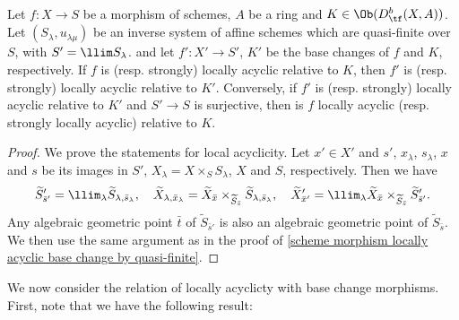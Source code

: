 \begin{corollary}\label{scheme morphism locally acyclic base change by limit}
Let $f:X\to S$ be a morphism of schemes, $A$ be a ring and $K\in\Ob(D^b_{\tf}(X,A))$. Let $(S_\lambda,u_{\lambda\mu})$ be an inverse system of affine schemes which are quasi-finite over $S$, with $S'=\llim S_\lambda$. and let $f':X'\to S'$, $K'$ be the base changes of $f$ and $K$, respectively. If $f$ is (resp. strongly) locally acyclic relative to $K$, then $f'$ is (resp. strongly) locally acyclic relative to $K'$. Conversely, if $f'$ is (resp. strongly) locally acyclic relative to $K'$ and $S'\to S$ is surjective, then is $f$ locally acyclic (resp. strongly locally acyclic) relative to $K$.
\end{corollary}
\begin{proof}
We prove the statements for local acyclicity. Let $x'\in X'$ and $s'$, $x_\lambda$, $s_\lambda$, $x$ and $s$ be its images in $S'$, $X_\lambda=X\times_SS_\lambda$, $X$ and $S$, respectively. Then we have
\[\widetilde{S}'_{\bar{s}'}=\llim_\lambda\widetilde{S}_{\lambda,\bar{s}_\lambda},\quad \widetilde{X}_{\lambda,\bar{x}_\lambda}=\widetilde{X}_{\bar{x}}\times_{\widetilde{S}_{\bar{s}}}\widetilde{S}_{\lambda,\bar{s}_\lambda},\quad \widetilde{X}'_{\bar{x}'}=\llim_\lambda\widetilde{X}_{\bar{x}}\times_{\widetilde{S}_{\bar{s}}}\widetilde{S}'_{\bar{s}'}.\]
Any algebraic geometric point $\bar{t}$ of $\widetilde{S}_{\bar{s}'}$ is also an algebraic geometric point of $\widetilde{S}_{\bar{s}}$. We then use the same argument as in the proof of \cref{scheme morphism locally acyclic base change by quasi-finite}.
\end{proof}

We now consider the relation of locally acyclicty with base change morphisms. First, note that we have the following result:

